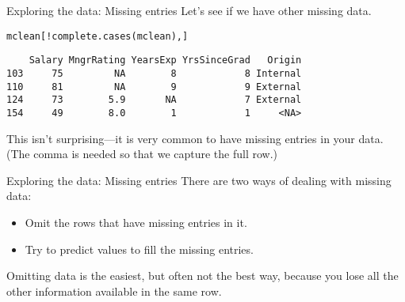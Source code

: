 \documentclass{beamer}\usepackage[]{graphicx}\usepackage[]{color}
\makeatletter
\newcommand{\hlopt}[1]{\textcolor[rgb]{1,0.894,0.769}{#1}}%
\newcommand{\hlstd}[1]{\textcolor[rgb]{1,0.894,0.769}{#1}}%
\newcommand{\hlkwb}[1]{\textcolor[rgb]{0.804,0.776,0.451}{#1}}%
\newcommand{\hlkwc}[1]{\textcolor[rgb]{0.78,0.941,0.545}{#1}}%
\newcommand{\hlkwd}[1]{\textcolor[rgb]{1,0.78,0.769}{#1}}%
\newenvironment{kframe}{%
 \def\at@end@of@kframe{}%
 \ifinner\ifhmode%
  \def\at@end@of@kframe{\end{minipage}}%
  \begin{minipage}{\columnwidth}%
 \fi\fi%
 \def\FrameCommand##1{\hskip\@totalleftmargin \hskip-\fboxsep
 \colorbox{shadecolor}{##1}\hskip-\fboxsep
     \hskip-\linewidth \hskip-\@totalleftmargin \hskip\columnwidth}%
 \MakeFramed {\advance\hsize-\width
   \@totalleftmargin\z@ \linewidth\hsize
   \@setminipage}}%
 {\par\unskip\endMakeFramed%
 \at@end@of@kframe}
\newenvironment{knitrout}{}{} %
\makeatother
\begin{document}
\begin{darkframes}
    \begin{frame}[fragile]{Exploring the data: Missing entries}
      Let's see if we have other missing data.
\begin{knitrout}
\color{fgcolor}\begin{kframe}
\begin{alltt}
\hlstd{mclean[}\hlopt{!}\hlkwd{complete.cases}\hlstd{(mclean),]}
\end{alltt}
\begin{verbatim}
    Salary MngrRating YearsExp YrsSinceGrad   Origin
103     75         NA        8            8 Internal
110     81         NA        9            9 External
124     73        5.9       NA            7 External
154     49        8.0        1            1     <NA>
\end{verbatim}
\end{kframe}
\end{knitrout}
      \pause
      This isn't surprising---it is very common to have missing entries in your data. (The comma is needed so that we capture the full row.)
    \end{frame}

    \begin{frame}[fragile]{Exploring the data: Missing entries}
      There are two ways of dealing with missing data:
      \begin{itemize}
        \item Omit the rows that have missing entries in it.
        \item Try to predict values to fill the missing entries.
      \end{itemize}
      Omitting data is the easiest, but often not the best way, \alert{because you lose all the other information available in the same row}.
    \end{frame}

\end{darkframes}
\end{document}
